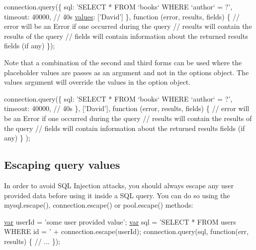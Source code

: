 \begin{DoxyCode}
connection.query(\{
  sql: \textcolor{stringliteral}{'SELECT * FROM `books` WHERE `author` = ?'},
  timeout: 40000, \textcolor{comment}{// 40s}
  \hyperlink{qtextcodec_8cpp_a48ca6217f9d5d1de9776060e1a8dbe58}{values}: [\textcolor{stringliteral}{'David'}]
\}, \textcolor{keyword}{function} (error, results, fields) \{
  \textcolor{comment}{// error will be an Error if one occurred during the query}
  \textcolor{comment}{// results will contain the results of the query}
  \textcolor{comment}{// fields will contain information about the returned results fields (if any)}
\});
\end{DoxyCode}


Note that a combination of the second and third forms can be used where the placeholder values are passes as an argument and not in the options object. The {\ttfamily values} argument will override the {\ttfamily values} in the option object.


\begin{DoxyCode}
connection.query(\{
    sql: \textcolor{stringliteral}{'SELECT * FROM `books` WHERE `author` = ?'},
    timeout: 40000, \textcolor{comment}{// 40s}
  \},
  [\textcolor{stringliteral}{'David'}],
  \textcolor{keyword}{function} (error, results, fields) \{
    \textcolor{comment}{// error will be an Error if one occurred during the query}
    \textcolor{comment}{// results will contain the results of the query}
    \textcolor{comment}{// fields will contain information about the returned results fields (if any)}
  \}
);
\end{DoxyCode}


\subsection*{Escaping query values}

In order to avoid S\+Q\+L Injection attacks, you should always escape any user provided data before using it inside a S\+Q\+L query. You can do so using the {\ttfamily mysql.\+escape()}, {\ttfamily connection.\+escape()} or {\ttfamily pool.\+escape()} methods\+:


\begin{DoxyCode}
\hyperlink{018__def_8c_a335628f2e9085305224b4f9cc6e95ed5}{var} userId = \textcolor{stringliteral}{'some user provided value'};
\hyperlink{018__def_8c_a335628f2e9085305224b4f9cc6e95ed5}{var} sql    = \textcolor{stringliteral}{'SELECT * FROM users WHERE id = '} + connection.escape(userId);
connection.query(sql, \textcolor{keyword}{function}(err, results) \{
  \textcolor{comment}{// ...}
\});
\end{DoxyCode}


